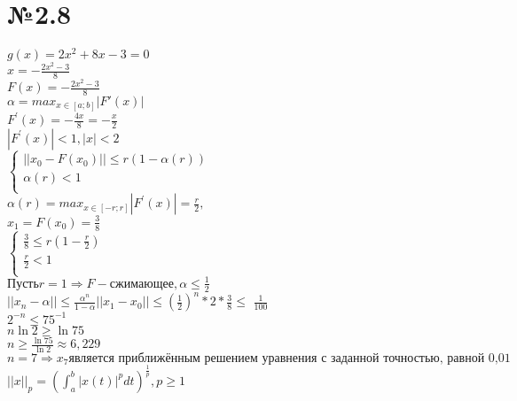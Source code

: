 \documentclass[oneside, final, 11pt]{article}
\begin{document}
\section{№2.8}
\begin{flushleft}
   $ g(x) = 2x^2+8x-3=0$ \\
    $x = - \frac{2x^2-3}{8} $\\
    $F(x) = - \frac{2x^2-3}{8} $\\
    $\alpha = max_{x\in[a;b]}|F'(x)|$\\
    $F^{'}(x) = -\frac{4x}{8} = - \frac{x}{2}$\\
    $|F^{'}(x)| < 1, |x| < 2 $\\
    $\begin{cases}
    ||x_0 - F(x_0)|| \leq r(1-\alpha(r)) \\
    \alpha(r) < 1 \\
    \end{cases}$\\
    $\alpha(r) = max_{x\in[-r;r]}|F^{'}(x)| = \frac{r}{2},$\\
    $x_1 = F(x_0) = \frac{3}{8} $\\
   $ \begin{cases}
    \frac{3}{8} \leq r(1-\frac{r}{2})\\
    \frac{r}{2} < 1\\
    \end{cases}$\\
    $ Пусть  r=1 \Rightarrow  F - сжимающее,  \alpha \leq \frac{1}{2}$ \\
    $||x_n - \alpha|| \leq \frac{\alpha^n}{1-\alpha}||x_1 - x_0||\leq \left(\frac{1}{2}\right)^n*2*\frac{3}{8}\leq$ $\frac{1}{100}$\\
    $2^{-n} \leq 75^{-1}$ \\
    $n\ln{2} \geq \ln{75}$ \\
    $n \geq \frac{\ln{75}}{\ln{2}} \approx 6,229$ \\
    $n = 7 \Rightarrow x_7 \text{является приближённым решением уравнения с заданной точностью, равной 0,01}$\\
    $||x||_p = (\int_a^b |x(t)|^p dt)^{\frac{1}{p}}, p \geq 1 $\\
\end{flushleft}
\end{document}
